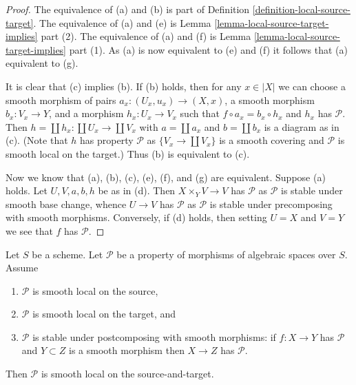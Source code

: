 \begin{proof}
The equivalence of (a) and (b) is part of
Definition \ref{definition-local-source-target}.
The equivalence of (a) and (e) is
Lemma \ref{lemma-local-source-target-implies} part (2).
The equivalence of (a) and (f) is
Lemma \ref{lemma-local-source-target-implies} part (1).
As (a) is now equivalent to (e) and (f) it follows that
(a) equivalent to (g).

\medskip\noindent
It is clear that (c) implies (b). If (b) holds, then for any
$x \in |X|$ we can choose a smooth morphism of pairs
$a_x : (U_x, u_x) \to (X, x)$, a smooth morphism $b_x : V_x \to Y$, and
a morphism $h_x : U_x \to V_x$ such that $f \circ a_x = b_x \circ h_x$ and
$h_x$ has $\mathcal{P}$. Then $h = \coprod h_x : \coprod U_x \to \coprod V_x$
with $a = \coprod a_x$ and $b = \coprod b_x$ is a diagram as in (c).
(Note that $h$ has property $\mathcal{P}$ as $\{V_x \to \coprod V_x\}$
is a smooth covering and $\mathcal{P}$ is smooth local on the target.)
Thus (b) is equivalent to (c).

\medskip\noindent
Now we know that (a), (b), (c), (e), (f), and (g) are equivalent.
Suppose (a) holds. Let $U, V, a, b, h$ be as in (d). Then
$X \times_Y V \to V$ has $\mathcal{P}$ as $\mathcal{P}$ is stable under
smooth base change, whence $U \to V$ has $\mathcal{P}$ as $\mathcal{P}$
is stable under precomposing with smooth morphisms. Conversely, if (d)
holds, then setting $U = X$ and $V = Y$ we see that $f$ has $\mathcal{P}$.
\end{proof}

\begin{lemma}
\label{lemma-smooth-local-source-target}
Let $S$ be a scheme.
Let $\mathcal{P}$ be a property of morphisms of algebraic spaces over $S$.
Assume
\begin{enumerate}
\item $\mathcal{P}$ is smooth local on the source,
\item $\mathcal{P}$ is smooth local on the target, and
\item $\mathcal{P}$ is stable under postcomposing with smooth morphisms:
if $f : X \to Y$ has $\mathcal{P}$ and $Y \subset Z$ is a smooth morphism
then $X \to Z$ has $\mathcal{P}$.
\end{enumerate}
Then $\mathcal{P}$ is smooth local on the source-and-target.
\end{lemma}


